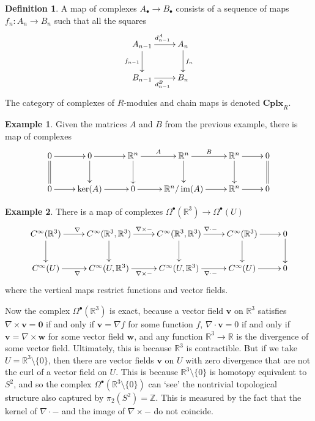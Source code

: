 \documentclass{tufte-handout}
\def\Cplx{\mathbf{Cplx}}
\def\RR{\mathbb{R}}
\def\ZZ{\mathbb{Z}}
\DeclareMathOperator{\im}{im}
\theoremstyle{definition}
\newtheorem{definition}{Definition}
\newtheorem{example}{Example}
\begin{document}
\begin{definition}
A map of complexes $A_\bullet \to 
B_\bullet$ consists of a sequence of maps $f_n\colon A_n \to B_n$ such that all the 
squares
\[
	\xymatrix{
		A_{n-1} \ar[r]^{d_{n-1}^A} \ar[d]_{f_{n-1}} & A_n \ar[d]^{f_n}\\
		B_{n-1} \ar[r]_{d_{n-1}^B} & B_n
	}
\]
The category of complexes of $R$-modules and chain maps is denoted $\Cplx_R$.
\end{definition}

\begin{example}
Given the matrices $A$ and $B$ from the previous example, there is map of complexes
\[
	\xymatrix{
		0 \ar[r] \ar@{=}[d] & 0 \ar[r] \ar[d] & \RR^n \ar[r]^A \ar[d] & \RR^n \ar[r]^B \ar[d] & \RR^n \ar[r] \ar[d] & 0 \ar@{=}[d]\\
		0 \ar[r] & \ker(A) \ar[r] & 0 \ar[r] & \RR^n/\im(A) \ar[r] & \RR^n \ar[r] & 0
	}
\]
\end{example}

\begin{example}
There is a map of complexes $\Omega^\bullet(\RR^3) \to \Omega^\bullet(U)$
\[
	\xymatrix{
	C^\infty(\RR^3) \ar[d] \ar[r]^{\nabla} & C^\infty(\RR^3,\RR^3) \ar[d] \ar[r]^{\nabla\times -} & C^\infty(\RR^3,\RR^3) \ar[d] \ar[r]^{\nabla\cdot -} & C^\infty(\RR^3) \ar[d] \ar[r] & 0 \ar[d] \\
	C^\infty(U) \ar[r]_{\nabla} & C^\infty(U,\RR^3) \ar[r]_{\nabla\times -} & C^\infty(U,\RR^3) \ar[r]_{\nabla\cdot -} & C^\infty(U)\ar[r] & 0
	}
\]
where the vertical maps restrict functions and vector fields.
\end{example}

Now the complex $\Omega^\bullet(\RR^3)$ is exact, because a vector field 
$\mathbf{v}$ on $\RR^3$ satisfies $\nabla\times \mathbf{v}=\mathbf{0}$ if and only if 
$\mathbf{v} = \nabla f$ for some function $f$, $\nabla\cdot \mathbf{v} = 0$ if and only 
if $\mathbf{v} = \nabla\times \mathbf{w}$ for some vector field $\mathbf{w}$, and any 
function $\RR^3\to \RR$ is the divergence of some vector field. Ultimately, this is 
because $\RR^3$ is contractible. But if we take $U = \RR^3\setminus\{0\}$, then there 
are vector fields $\mathbf{v}$ on $U$ with zero divergence that are not the curl of a 
vector field on $U$. This is because $\RR^3\setminus\{0\}$ is homotopy equivalent to 
$S^2$, and so the complex $\Omega^\bullet(\RR^3\setminus\{0\})$ can `see' the 
nontrivial topological structure also captured by $\pi_2(S^2) = \ZZ$. This is measured 
by the fact that the kernel of $\nabla\cdot -$ and the image of $\nabla\times -$ do not 
coincide.
\end{document}
